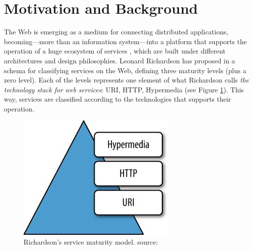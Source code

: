 \section{Motivation and Background}
\label{sec:motivation_background}

\noindent The Web is emerging as a medium for connecting distributed applications, becoming---more than an information system---into a platform that
supports the operation of a huge ecosystem of services \cite{Webber:2010a}, which are built under different architectures and design philosophies. Leonard Richardson has proposed in \cite{Richardson:2008} a schema for classifying services on the Web, defining three maturity levels (plus a zero level). Each of the levels represents one element of what Richardson calls \emph{the technology stack for web services}: URI, HTTP, Hypermedia (see Figure \ref{richardsonModel}). This way, services are classified according to the technologies that supports their operation.

\begin{figure}[H]
\center\includegraphics[scale=0.6]{images/WS-MaturityModel}

\caption{Richardson's service maturity model. {\scriptsize source: \cite{Webber:2010a}}}
\label{richardsonModel}
\end{figure}

